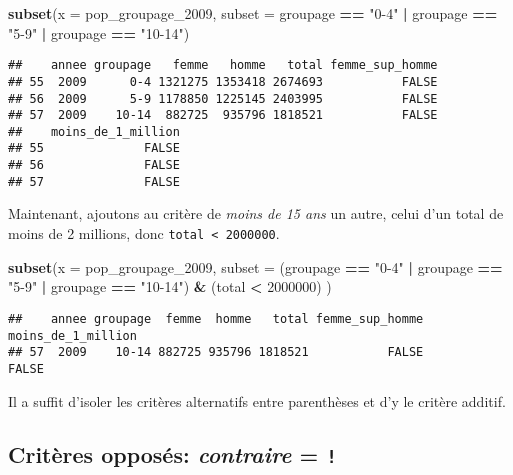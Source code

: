 \documentclass[]{book}
\newenvironment{Shaded}{\begin{snugshade}}{\end{snugshade}}
\newcommand{\KeywordTok}[1]{\textcolor[rgb]{0.13,0.29,0.53}{\textbf{#1}}}
\newcommand{\DataTypeTok}[1]{\textcolor[rgb]{0.13,0.29,0.53}{#1}}
\newcommand{\DecValTok}[1]{\textcolor[rgb]{0.00,0.00,0.81}{#1}}
\newcommand{\StringTok}[1]{\textcolor[rgb]{0.31,0.60,0.02}{#1}}
\newcommand{\OperatorTok}[1]{\textcolor[rgb]{0.81,0.36,0.00}{\textbf{#1}}}
\newcommand{\NormalTok}[1]{#1}
\begin{document}
\begin{Shaded}
\begin{Highlighting}[]
\KeywordTok{subset}\NormalTok{(}\DataTypeTok{x =}\NormalTok{ pop_groupage_}\DecValTok{2009}\NormalTok{, }\DataTypeTok{subset =}\NormalTok{ groupage }\OperatorTok{==}\StringTok{ "0-4"} \OperatorTok{|}\StringTok{ }\NormalTok{groupage }\OperatorTok{==}\StringTok{ "5-9"} \OperatorTok{|}\StringTok{ }\NormalTok{groupage }\OperatorTok{==}\StringTok{ "10-14"}\NormalTok{)}
\end{Highlighting}
\end{Shaded}

\begin{verbatim}
##    annee groupage   femme   homme   total femme_sup_homme
## 55  2009      0-4 1321275 1353418 2674693           FALSE
## 56  2009      5-9 1178850 1225145 2403995           FALSE
## 57  2009    10-14  882725  935796 1818521           FALSE
##    moins_de_1_million
## 55              FALSE
## 56              FALSE
## 57              FALSE
\end{verbatim}

Maintenant, ajoutons au critère de \emph{moins de 15 ans} un autre,
celui d'un total de moins de 2 millions, donc
\texttt{total\ \textless{}\ 2000000}.

\begin{Shaded}
\begin{Highlighting}[]
\KeywordTok{subset}\NormalTok{(}\DataTypeTok{x =}\NormalTok{ pop_groupage_}\DecValTok{2009}\NormalTok{, }\DataTypeTok{subset =}\NormalTok{ (groupage }\OperatorTok{==}\StringTok{ "0-4"} \OperatorTok{|}\StringTok{ }\NormalTok{groupage }\OperatorTok{==}\StringTok{ "5-9"} \OperatorTok{|}\StringTok{ }\NormalTok{groupage }\OperatorTok{==}\StringTok{ "10-14"}\NormalTok{) }\OperatorTok{&}\StringTok{ }\NormalTok{(total }\OperatorTok{<}\StringTok{ }\DecValTok{2000000}\NormalTok{) )}
\end{Highlighting}
\end{Shaded}

\begin{verbatim}
##    annee groupage  femme  homme   total femme_sup_homme moins_de_1_million
## 57  2009    10-14 882725 935796 1818521           FALSE              FALSE
\end{verbatim}

Il a suffit d'isoler les critères alternatifs entre parenthèses et d'y
le critère additif.

\subsection{\texorpdfstring{Critères opposés: \emph{contraire} =
\texttt{!}}{Critères opposés: contraire = !}}\label{criteres-opposes-contraire}
\end{document}
